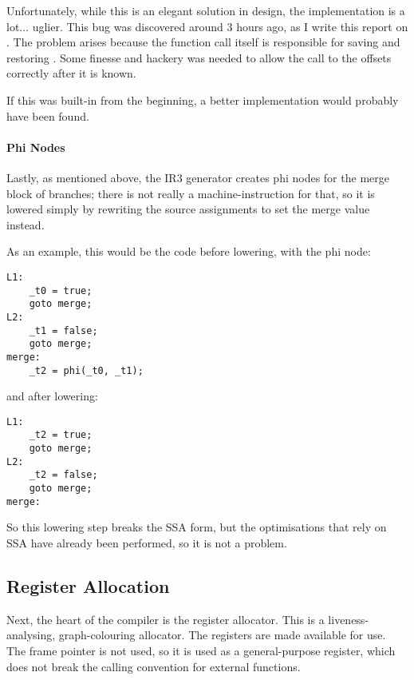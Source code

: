 \documentclass[12pt]{article}
\begin{document}
Unfortunately, while this is an elegant solution in design, the implementation is a lot... uglier. This bug was
discovered around 3 hours ago, as I write this report on . The problem arises because the
function call itself is responsible for saving and restoring . Some finesse and hackery was needed to
allow the call to  the offsets correctly after it is known.

If this was built-in from the beginning, a better implementation would probably have been found.




\paragraph{Phi Nodes}

Lastly, as mentioned above, the IR3 generator creates phi nodes for the merge block of branches; there is not really
a machine-instruction for that, so it is lowered simply by rewriting the source assignments to set the merge value
instead.

As an example, this would be the code before lowering, with the phi node:

\begin{verbatim}
L1:
	_t0 = true;
	goto merge;
L2:
	_t1 = false;
	goto merge;
merge:
	_t2 = phi(_t0, _t1);
\end{verbatim}

and after lowering:

\begin{verbatim}
L1:
	_t2 = true;
	goto merge;
L2:
	_t2 = false;
	goto merge;
merge:
\end{verbatim}

So this lowering step breaks the SSA form, but the optimisations that rely on SSA have already been performed, so it
is not a problem.



\subsection{Register Allocation}

Next, the heart of the compiler is the register allocator. This is a liveness-analysing, graph-colouring allocator. The
registers  are made available for use. The frame pointer is not used, so it is used as
a general-purpose register, which does not break the calling convention for external functions.
\end{document}
